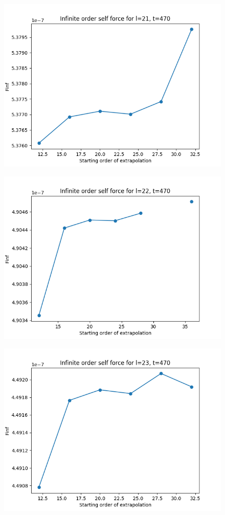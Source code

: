 \documentclass{article}
\begin{document}
\begin{figure}
  \includegraphics{bestfinfselectorplott470l21}
\end{figure}
\begin{figure}
  \includegraphics{bestfinfselectorplott470l22}
\end{figure}
\begin{figure}
  \includegraphics{bestfinfselectorplott470l23}
\end{figure}
\end{document}
